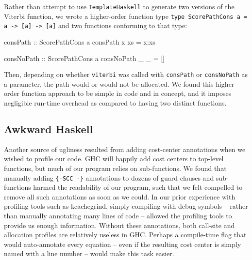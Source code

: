 \documentclass[preprint,nonatbib,blockstyle,nocopyrightspace,times]{sigplanconf}
\newenvironment{smallverbatim}{\par\small\verbatim}{\endverbatim}
\begin{document}
Rather than attempt to use \texttt{TemplateHaskell} to generate two versions of 
the Viterbi function, we wrote a higher-order function type 
\lstinline!type ScorePathCons a = a -> [a] -> [a]! and two functions conforming to that type:
\begin{smallverbatim}
consPath :: ScorePathCons a
consPath x xs = x:xs

consNoPath :: ScorePathCons a
consNoPath _ _ = []
\end{smallverbatim}

Then, depending on whether \texttt{viterbi} was called with \texttt{consPath} 
or \texttt{consNoPath} as a parameter, the path would or would not be 
allocated.
We found this higher-order function approach to be simple in code 
and in concept, and it imposes negligible run-time overhead as compared to 
having two distinct functions.

\subsection{Awkward Haskell}

Another source of ugliness resulted from adding cost-center annotations when we 
wished to profile our code.
GHC will happily add cost centers to top-level 
functions, but much of our program relies on sub-functions.
We found that 
manually adding \texttt{\{-SCC -\}} annotations to dozens of guard clauses and 
sub-functions harmed the readability of our program, such that we felt 
compelled to remove all such annotations as soon as we could.
In our prior 
experience with profiling tools such as kcachegrind, simply compiling with 
debug symbols -- rather than manually annotating many lines of code -- allowed 
the profiling tools to provide us enough information.
Without these 
annotations, both call-site and allocation profiles are relatively useless in 
GHC.
Perhaps a compile-time flag that would auto-annotate every equation -- 
even if the resulting cost center is simply named with a line number -- would 
make this task easier.
\end{document}
